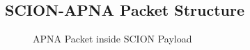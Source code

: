 \subsection{SCION-APNA Packet Structure}
\begin{figure}[th!!]
\centering
\noindent
{}
\decoRule
\caption[APNA packet structure inside SCION]{APNA Packet inside SCION Payload}
\label{fig:apna_scion_pkt}
\end{figure}

